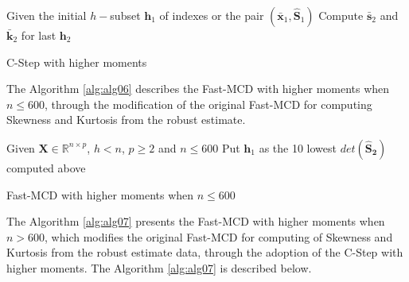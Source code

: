 \documentclass[review]{elsarticle}
\begin{document}
\begin{algorithm}
	\label{alg:alg05}
	\scriptsize
	\SetAlgoLined
	Given the initial $h-$subset $\boldsymbol{h}_1$ of indexes or the pair $(\boldsymbol{\bar{x}}_1, \boldsymbol{\hat{S}}_1)$\;
	Compute $\boldsymbol{\bar{s}}_2$ and $\boldsymbol{\bar{k}}_2$ for last $\boldsymbol{h}_2$\;
	\caption{C-Step with higher moments}
\end{algorithm}

The Algorithm \ref{alg:alg06} describes the Fast-MCD with higher moments when $n \leq 600$, through the modification of the original Fast-MCD for computing Skewness and Kurtosis from the robust estimate.
    
\begin{algorithm}
	\label{alg:alg06}
	\scriptsize
	\SetAlgoLined
	Given $\boldsymbol{X} \in \mathbb{R}^{n \times p}$, $h < n$, $p \geq 2$ and $n \leq 600$\;
	Put $\boldsymbol{h}_1$ as the 10 lowest $det(\boldsymbol{\hat{S}_2})$ computed above\;
	\caption{Fast-MCD with higher moments when $n \leq 600$}
\end{algorithm}

The Algorithm \ref{alg:alg07} presents the Fast-MCD with higher moments when $n > 600$, which modifies the original Fast-MCD for computing of Skewness and Kurtosis from the robust estimate data, through the adoption of the C-Step with higher moments. The Algorithm \ref{alg:alg07} is described below.
\end{document}
